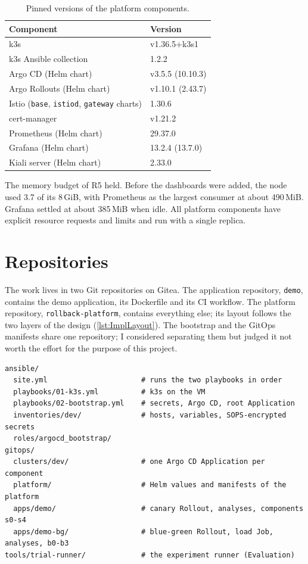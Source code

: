 \begin{table}[ht]
	\footnotesize
	\centering
	\begin{tabular}{ l l }
		\toprule
		Component & Version \\
		\midrule
		k3s & v1.36.5+k3s1 \\
		k3s Ansible collection & 1.2.2 \\
		Argo CD (Helm chart) & v3.5.5 (10.10.3) \\
		Argo Rollouts (Helm chart) & v1.10.1 (2.43.7) \\
		Istio (\texttt{base}, \texttt{istiod}, \texttt{gateway} charts) & 1.30.6 \\
		cert-manager & v1.21.2 \\
		Prometheus (Helm chart) & 29.37.0 \\
		Grafana (Helm chart) & 13.2.4 (13.7.0) \\
		Kiali server (Helm chart) & 2.33.0 \\
		\bottomrule
	\end{tabular}
	\caption{Pinned versions of the platform components.}
	\label{tab:ImplVersions}
\end{table}

The memory budget of R5 held. Before the dashboards were added, the node used 3.7 of its 8\,GiB, with Prometheus as the largest consumer at about 490\,MiB. Grafana settled at about 385\,MiB when idle. All platform components have explicit resource requests and limits and run with a single replica.

\section{Repositories}
\label{sec:ImplRepos}
The work lives in two Git repositories on Gitea. The application repository, \texttt{demo}, contains the demo application, its Dockerfile and its CI workflow. The platform repository, \texttt{rollback-platform}, contains everything else; its layout follows the two layers of the design (\autoref{lst:ImplLayout}). The bootstrap and the GitOps manifests share one repository; I considered separating them but judged it not worth the effort for the purpose of this project.

\begin{lstlisting}[caption={Layout of the platform repository (abridged).},label=lst:ImplLayout]
ansible/
  site.yml                      # runs the two playbooks in order
  playbooks/01-k3s.yml          # k3s on the VM
  playbooks/02-bootstrap.yml    # secrets, Argo CD, root Application
  inventories/dev/              # hosts, variables, SOPS-encrypted secrets
  roles/argocd_bootstrap/
gitops/
  clusters/dev/                 # one Argo CD Application per component
  platform/                     # Helm values and manifests of the platform
  apps/demo/                    # canary Rollout, analyses, components s0-s4
  apps/demo-bg/                 # blue-green Rollout, load Job, analyses, b0-b3
tools/trial-runner/             # the experiment runner (Evaluation)
\end{lstlisting}

